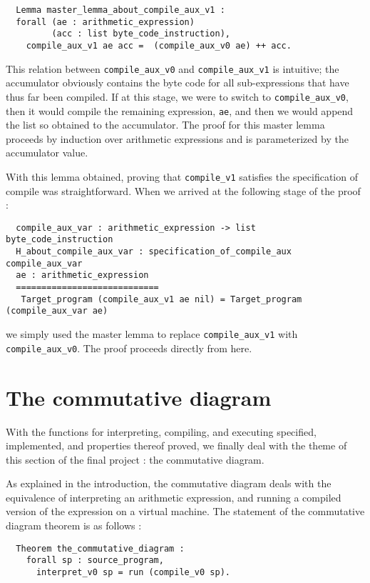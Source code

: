 \documentclass[12pt, a4paper]{article}
\begin{document}
\begin{lstlisting}
  Lemma master_lemma_about_compile_aux_v1 :
  forall (ae : arithmetic_expression)
         (acc : list byte_code_instruction),
    compile_aux_v1 ae acc =  (compile_aux_v0 ae) ++ acc.
\end{lstlisting}

This relation between \verb-compile_aux_v0- and \verb-compile_aux_v1- is 
intuitive; the accumulator obviously contains the byte code for all sub-expressions
that have thus far been compiled. If at this stage, we were to switch to  
\verb-compile_aux_v0-, then it would compile the remaining expression, \verb-ae-, and then we would append the list so obtained to the accumulator. The proof for
this master lemma proceeds by induction over arithmetic expressions and is 
parameterized by the 
accumulator value. 

With this lemma obtained, proving that \verb-compile_v1- 
satisfies the specification of compile was straightforward. When we arrived at the 
following stage of the proof : 

\begin{lstlisting}
  compile_aux_var : arithmetic_expression -> list byte_code_instruction
  H_about_compile_aux_var : specification_of_compile_aux compile_aux_var
  ae : arithmetic_expression
  ============================
   Target_program (compile_aux_v1 ae nil) = Target_program (compile_aux_var ae)
\end{lstlisting}

we simply used the master lemma to replace \verb-compile_aux_v1- with 
\verb-compile_aux_v0-. The proof proceeds directly from here.


\section{ The commutative diagram}
With the functions for interpreting, compiling, and executing specified, implemented,
and properties thereof proved, we finally deal with the theme of this section of
the final project : the commutative diagram. 

As explained in the introduction, the commutative diagram deals with the equivalence
of interpreting an arithmetic expression, and running a compiled version of the
expression on a virtual machine. The statement of the commutative diagram theorem 
is as follows : 

\begin{lstlisting}
  Theorem the_commutative_diagram :
    forall sp : source_program,
      interpret_v0 sp = run (compile_v0 sp).
\end{lstlisting}
\end{document}
